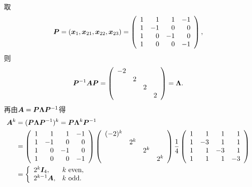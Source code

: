 \begin{jie}
  取
  $$
  \boldsymbol{P}=({\boldsymbol{x}}_1,{\boldsymbol{x}}_{21},{\boldsymbol{x}}_{22},{\boldsymbol{x}}_{23})=
  \left(
    \begin{array}{rrrr}
      1& 1& 1&-1\\
      1&-1& 0& 0\\
      1& 0&-1& 0\\
      1& 0& 0&-1
    \end{array}
  \right),
  $$
  则
  $$
  \boldsymbol{P}^{-1}\boldsymbol{A}\boldsymbol{P}=\left(
    \begin{array}{rrrr}
      -2&&&\\
        &2&&\\
        &&2\\
        &&&2
    \end{array}
  \right)=\boldsymbol{\Lambda}.
  $$
  再由$\boldsymbol{A}=\boldsymbol{P}\boldsymbol{\Lambda}\boldsymbol{P}^{-1}$得
  $$
  \begin{aligned}
    \boldsymbol{A}^k&=(\boldsymbol{P}\boldsymbol{\Lambda}\boldsymbol{P}^{-1})^k=\boldsymbol{P}\boldsymbol{\Lambda}^k\boldsymbol{P}^{-1}\\
    &=\left(
    \begin{array}{rrrr}
      1& 1& 1&-1\\
      1&-1& 0& 0\\
      1& 0&-1& 0\\
      1& 0& 0&-1
    \end{array}
  \right)
  \left(
    \begin{array}{rrrr}
      (-2)^k&&&\\
        &2^k&&\\
        &&2^k\\
        &&&2^k
    \end{array}
  \right)
  \frac14
  \left(
    \begin{array}{rrrr}
      1& 1& 1& 1\\
      1&-3& 1& 1\\
      1& 1&-3& 1\\
      1& 1& 1&-3
    \end{array}
  \right)\\
  &=\left\{
    \begin{array}{ll}
      2^k \boldsymbol{I}_4, & k\mbox{ even}, \\
      2^{k-1} \boldsymbol{A}, & k\mbox{ odd}.
    \end{array}
  \right.
  \end{aligned}
  $$
\end{jie}


